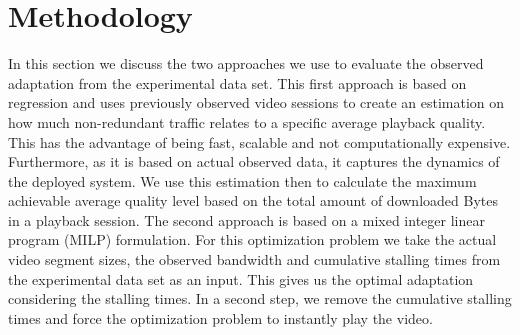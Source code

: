 
\section{Methodology}

\label{sec:sysmodel}

In this section we discuss the two approaches we use to evaluate the observed adaptation from the experimental data set.
This first approach is based on regression and uses previously observed video sessions to create an estimation on how much non-redundant traffic relates to a specific average playback quality.
This has the advantage of being fast, scalable and not computationally expensive. 
Furthermore, as it is based on actual observed data, it captures the dynamics of the deployed system.
We use this estimation then to calculate the maximum achievable average quality level based on the total amount of downloaded Bytes in a playback session.
The second approach is based on a mixed integer linear program (MILP) formulation. 
For this optimization problem we take the actual video segment sizes, the observed bandwidth and cumulative stalling times from the experimental data set as an input.
This gives us the optimal adaptation considering the stalling times.
In a second step, we remove the cumulative stalling times and force the optimization problem to instantly play the video.




